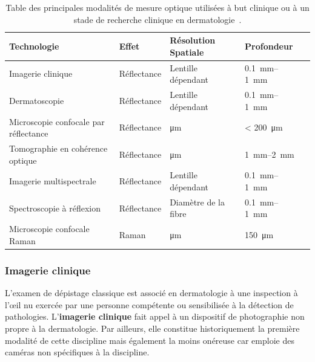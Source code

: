 \begin{table}[H]
\begin{tabular}{lllll}
    \toprule
    \textbf{Technologie}                        & \textbf{Effet}    & \textbf{Résolution Spatiale} & \textbf{Profondeur}                \\ \hline
    Imagerie clinique                           & Réflectance       & Lentille dépendant           & \SIrange{0.1}{1}{\milli\metre}     \\
    Dermatoscopie                               & Réflectance       & Lentille dépendant           & \SIrange{0.1}{1}{\milli\metre}     \\
    Microscopie confocale par réflectance       & Réflectance       & \si{\micro\metre}            & \textless{} \SI{200}{\micro\metre} \\
    Tomographie en cohérence optique            & Réflectance       & \si{\micro\metre}            & \SIrange{1}{2}{\milli\metre}       \\
    Imagerie multispectrale                     & Réflectance       & Lentille dépendant           & \SIrange{0.1}{1}{\milli\metre}     \\
    Spectroscopie à réflexion                   & Réflectance       & Diamètre de la fibre         & \SIrange{0.1}{1}{\milli\metre}     \\
    Microscopie confocale Raman                 & Raman             & \si{\micro\metre}            & \SI{150}{\micro\metre}             \\
    \bottomrule
\end{tabular}
\caption{Table des principales modalités de mesure optique utilisées à but clinique ou à un stade de recherche clinique en dermatologie~\cite{Kollias2002}.}
\label{tab:light_absorption}
\end{table}\par

\subsubsection{Imagerie clinique}
L’examen de dépistage classique est associé en dermatologie à une inspection à l’œil nu exercée par une personne compétente ou sensibilisée à la détection de pathologies. L'\textbf{imagerie clinique} fait appel à un dispositif de photographie non propre à la dermatologie. Par ailleurs, elle constitue historiquement la première modalité de cette discipline mais également la moins onéreuse car emploie des caméras non spécifiques à la discipline.\par

